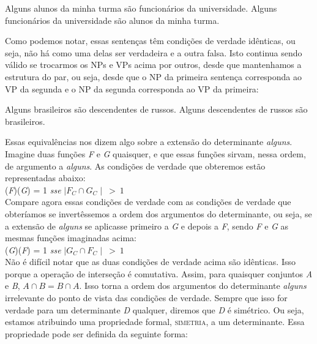 \begin{exe}
    \ex\label{prop}
    \begin{xlist}
        \ex  Alguns alunos da minha turma são funcionários da universidade.\label{propa}
        \ex  Alguns funcionários da universidade são alunos da minha turma.\label{propc}
    \end{xlist}
\end{exe}

\n Como podemos notar, essas sentenças têm condições de verdade
idênticas, ou seja, não há como uma delas ser verdadeira e a outra
falsa. Isto continua sendo válido se trocarmos os NPs e VPs acima
por outros, desde que mantenhamos a estrutura do par, ou seja, desde
que o NP da primeira sentença corresponda ao VP da segunda e o NP
da segunda corresponda ao VP da primeira:


\begin{exe}
    \ex\label{ch}
    \begin{xlist}
        \ex  Alguns brasileiros são descendentes de
        russos.\label{cha}
        \ex  Alguns descendentes de russos são brasileiros.\label{chc}
    \end{xlist}
\end{exe}

\n Essas equivalências nos dizem algo sobre a extensão do
determinante \textit{alguns}. Imagine duas funções \textit{F} e
\textit{G} quaisquer, e que essas funções sirvam, nessa ordem, de
argumento a \textit{alguns}. As condições de verdade que
obteremos
estão representadas abaixo:\\

\n {}(\textit{F})(\textit{G}) = 1 \textit{sse} $\mid
F_{C} \cap G_{C}\mid\ >\ 1$\\

\n Compare agora essas condições de verdade com as condições de
verdade que obteríamos se invertêssemos a ordem dos argumentos do
determinante, ou seja, se a extensão de \textit{alguns} se
aplicasse primeiro a \textit{G} e depois a \textit{F}, sendo
\textit{F} e \textit{G} as mesmas funções imaginadas acima:\\

\n {}(\textit{G})(\textit{F}) = 1 \textit{sse} $\mid
G_{C} \cap F_{C}\mid\ >\ 1$\\

\n Não é difícil notar que as duas condições de verdade acima são
idênticas. Isso porque a operação de interseção é comutativa.
Assim, para quaisquer conjuntos \textit{A} e \textit{B}, $ A\cap B
=  B\cap A$. Isso torna a ordem dos argumentos do determinante
\textit{alguns} irrelevante do ponto de vista das condições de verdade. Sempre que isso for verdade para um
determinante \textit{D} qualquer, diremos que \textit{D} é
simétrico. Ou seja, estamos atribuindo uma propriedade formal,
\textsc{simetria}, a um determinante. Essa propriedade pode ser
definida da seguinte forma:\\

